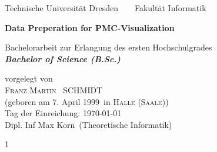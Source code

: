 \documentclass[a4paper,12pt,leqno]{article}
\newcommand{\name}{Schmidt}
\newcommand{\vorname}{Franz Martin}
\newcommand{\gebdatum}{7. April 1999}
\newcommand{\ort}{Halle (Saale)}
\newcommand{\betreuer}{Dipl. Inf Max Korn}
\newcommand{\institut}{Theoretische Informatik}
\newcommand{\thema}{Data Preperation for PMC-Visualization}
\newcommand{\datum}{\today} %
\begin{document}


\thispagestyle{empty}

\begin{center}
{\Large Technische Universit\"{a}t Dresden\  \ \textbullet\ \ Fakult\"{a}t Informatik}

\vfil

{\bfseries\Huge\thema}

\vfil
{\LARGE
Bachelorarbeit zur Erlangung des ersten Hochschulgrades \\[\bigskipamount]
\bfseries{\itshape Bachelor of Science (B.Sc.)}\\[\bigskipamount]
}

\vfil\vfil

\vfil

vorgelegt von
\\[\bigskipamount]
\textsc{\vorname\ } \MakeUppercase{\name}
\\[\bigskipamount]
(geboren am \gebdatum\ in \textsc{\ort})
\\[\bigskipamount]
Tag der Einreichung: \datum
\\[\bigskipamount]
\betreuer\ (\institut)
\end{center}

\cleardoublepage

\tableofcontents

\thispagestyle{empty}
\cleardoublepage


\setcounter{page}1




























%
%
%

\end{document}
